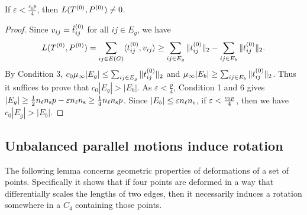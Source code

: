 \begin{lemma} \label{lem:T0-feasible-bipartite} 
If $\varepsilon < \frac{c_0 p}{4}$, then $L(T^{(0)}, P^{(0)}) \neq 0$.
\end{lemma}
\begin{proof}
Since $v_{ij} = \hat{t}^{(0)}_{ij}$ for all $ij \in E_g$, we have
\[
L(T^{(0)},P^{(0)}) = \sum_{ij \in E(G)} \langle t^{{(0)}}_{ij}, v_{ij} \rangle \geq \sum_{ij \in E_g} \| t^{{(0)}}_{ij}\|_2 - \sum_{ij \in E_b} \| t^{{(0)}}_{ij} \|_2.
\]
By Condition 3,  $c_0 \mu_{\infty} |E_g| \leq \sum_{ij \in E_g} \| t^{{(0)}}_{ij}\|_2$ and $\mu_{\infty} |E_b| \geq  \sum_{ij\in E_b} \| t^{{(0)}}_{ij}\|_2$.  Thus it suffices to prove that $c_0 |E_g| > |E_b|$. 
As $\varepsilon < \frac{p}{4}$, Condition 1 and 6 gives $|E_g| \geq \frac{1}{2} n_\ell n_\text{s} p - \varepsilon n_\ell n_\text{s} \geq \frac{1}{4}n_\ell n_\text{s} p$. Since $|E_b| \leq \varepsilon n_\ell n_\text{s}$, if $\varepsilon < \frac{c_0 p}{4}$, then we have $c_0 |E_g| > |E_b|$. 
\end{proof}




\subsection{Unbalanced parallel motions induce rotation} \label{sec-unbalanced-motions}

The following lemma concerns geometric properties of deformations of a set of points.  Specifically it shows that if four points are deformed in a way that differentially scales the lengths of two edges, then it necessarily induces a rotation somewhere in a $C_4$ containing those points.


